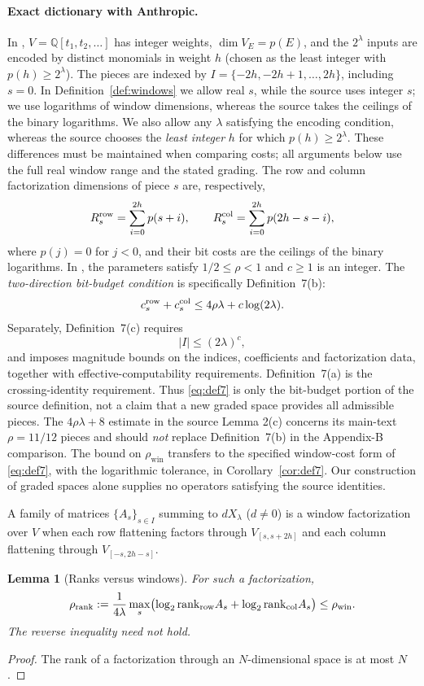 \documentclass[10pt,a4paper]{article}
\numberwithin{equation}{section}
\newtheorem{lemma}[theorem]{Lemma}\newtheorem{proposition}[theorem]{Proposition}
\theoremstyle{remark}\newtheorem{remark}[theorem]{Remark}\newtheorem{question}[theorem]{Question}
\newcommand{\rhow}{\rho_{\mathrm{win}}}\newcommand{\F}{\mathbb F}\newcommand{\K}{\mathbb K}\newcommand{\Z}{\mathbb Z}\newcommand{\R}{\mathbb R}\newcommand{\cB}{\mathcal L}\newcommand{\wt}{\mathrm{wt}}\newcommand{\dimn}{\operatorname{dim}}\newcommand{\supp}{\operatorname{supp}}
\begin{document}
\paragraph{Exact dictionary with Anthropic.}
In \cite[Appendix B, equations (54)--(56)]{claude3sat}, $V=\mathbb Q[t_1,t_2,\ldots]$ has integer weights, $\dimn V_E=p(E)$, and the $2^\lambda$ inputs are encoded by distinct monomials in weight $h$ (chosen as the least integer with $p(h)\ge2^\lambda$). The pieces are indexed by
\(I=\{-2h,-2h+1,\ldots,2h\}\), including $s=0$. In Definition~\ref{def:windows} we allow real $s$, while the source uses integer $s$; we use logarithms of window dimensions, whereas the source takes the ceilings of the binary logarithms. We also allow any $\lambda$ satisfying the encoding condition, whereas the source chooses the \emph{least integer} $h$ for which $p(h)\ge2^\lambda$. These differences must be maintained when comparing costs; all arguments below use the full real window range and the stated grading. The row and column factorization dimensions of piece $s$ are, respectively,
\[
R_s^{\rm row}=\sum_{i=0}^{2h}p(s+i),\qquad
R_s^{\rm col}=\sum_{i=0}^{2h}p(2h-s-i),
\]
where $p(j)=0$ for $j<0$, and their bit costs are the ceilings of the binary logarithms. In \cite[Definition~7]{claude3sat}, the parameters satisfy $1/2\le\rho<1$ and $c\ge1$ is an integer. The \emph{two-direction bit-budget condition} is specifically Definition~7(b):
\begin{equation}\label{eq:def7}
c_s^{\rm row}+c_s^{\rm col}\le4\rho\lambda+c\log(2\lambda).
\end{equation}
Separately, Definition~7(c) requires
\[
|I|\le(2\lambda)^c,
\]
and imposes magnitude bounds on the indices, coefficients and factorization data, together with effective-computability requirements. Definition~7(a) is the crossing-identity requirement. Thus \eqref{eq:def7} is only the bit-budget portion of the source definition, not a claim that a new graded space provides all admissible pieces. The $4\rho\lambda+8$ estimate in the source Lemma 2(c) concerns its main-text $\rho=11/12$ pieces and should \emph{not} replace Definition~7(b) in the Appendix-B comparison. The bound on $\rhow$ transfers to the specified window-cost form of \eqref{eq:def7}, with the logarithmic tolerance, in Corollary~\ref{cor:def7}. Our construction of graded spaces alone supplies no operators satisfying the source identities.

A family of matrices $\{A_s\}_{s\in I}$ summing to $dX_\lambda$ ($d\ne0$) is a window factorization over $V$ when each row flattening factors through $V_{[s,s+2h]}$ and each column flattening through $V_{[-s,2h-s]}$.
\begin{lemma}[Ranks versus windows]\label{lem:ranks-windows}
For such a factorization,
\[
\rho_{\rm rank}:=\frac1{4\lambda}\max_s\bigl(\log_2\mathrm{rank}_{\rm row}A_s+\log_2\mathrm{rank}_{\rm col}A_s\bigr)\le\rhow.
\]
The reverse inequality need not hold.
\end{lemma}
\begin{proof}The rank of a factorization through an $N$-dimensional space is at most $N$.\end{proof}
\end{document}

